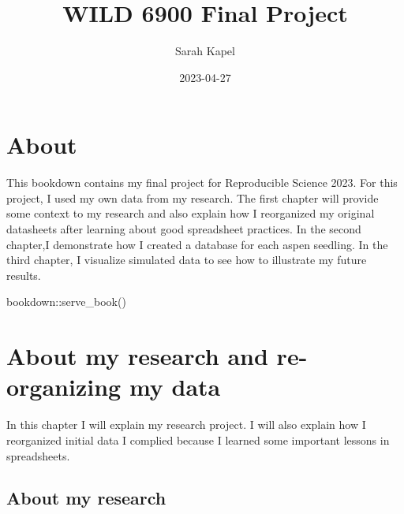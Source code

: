 \documentclass[
]{book}
\title{WILD 6900 Final Project}
\author{Sarah Kapel}
\date{2023-04-27}
\newenvironment{Shaded}{\begin{snugshade}}{\end{snugshade}}
\newcommand{\FunctionTok}[1]{\textcolor[rgb]{0.00,0.00,0.00}{#1}}
\newcommand{\NormalTok}[1]{#1}
\newcommand{\SpecialCharTok}[1]{\textcolor[rgb]{0.00,0.00,0.00}{#1}}
\begin{document}
\maketitle

{
\setcounter{tocdepth}{1}
\tableofcontents
}
\hypertarget{about}{%
\chapter{About}\label{about}}

This bookdown contains my final project for Reproducible Science 2023. For
this project, I used my own data from my research. The first chapter will
provide some context to my research and also explain how I reorganized my
original datasheets after learning about good spreadsheet practices. In the
second chapter,I demonstrate how I created a database for each aspen seedling.
In the third chapter, I visualize simulated data to see how to illustrate
my future results.

\begin{Shaded}
\begin{Highlighting}[]
\NormalTok{bookdown}\SpecialCharTok{::}\FunctionTok{serve\_book}\NormalTok{()}
\end{Highlighting}
\end{Shaded}

\hypertarget{about-my-research-and-re-organizing-my-data}{%
\chapter{About my research and re-organizing my data}\label{about-my-research-and-re-organizing-my-data}}

In this chapter I will explain my research project. I will also explain how I
reorganized initial data I complied because I learned some important lessons in
spreadsheets.

\hypertarget{about-my-research}{%
\section{About my research}\label{about-my-research}}
\end{document}

